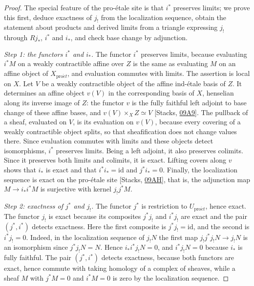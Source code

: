 \documentclass[11pt]{article}
\begin{document}
\begin{proof}[{Proof}]\label{bp180}%
The special feature of the pro-étale site is that \(i^*\) preserves limits; we prove this first, deduce exactness of \(j_!\) from the localization sequence, obtain the statement about products and derived limits from a triangle expressing \(j_!\) through \(Rj_*\), \(i^*\) and \(i_*\), and check base change by adjunction.

\emph{Step 1: the functors \(i^*\) and \(i_*\).} The functor \(i^*\) preserves limits, because evaluating \(i^*M\) on a weakly contractible affine over \(Z\) is the same as evaluating \(M\) on an affine object of \(X_{\mathrm{pro}\acute{e}t}\), and evaluation commutes with limits. The assertion is local on \(X\). Let \(V\) be a weakly contractible object of the affine ind-étale basis of \(Z\). It determines an affine object \(v(V)\) in the corresponding basis of \(X\), henselian along its inverse image of \(Z\): the functor \(v\) is the fully faithful left adjoint to base change of these affine bases, and \(v(V)\times_XZ\simeq V\) [Stacks, \href{https://stacks.math.columbia.edu/tag/09A9}{09A9}]. The pullback of a sheaf, evaluated on \(V\), is its evaluation on \(v(V)\), because every covering of a weakly contractible object splits, so that sheafification does not change values there. Since evaluation commutes with limits and these objects detect isomorphisms, \(i^*\) preserves limits. Being a left adjoint, it also preserves colimits. Since it preserves both limits and colimits, it is exact. Lifting covers along \(v\) shows that \(i_*\) is exact and that \(i^*i_*=\mathrm{id}\) and \(j^*i_*=0\). Finally, the localization sequence is exact on the pro-étale site [Stacks, \href{https://stacks.math.columbia.edu/tag/09AH}{09AH}], that is, the adjunction map \(M\to i_*i^*M\) is surjective with kernel \(j_!j^*M\).

\emph{Step 2: exactness of \(j^*\) and \(j_!\).} The functor \(j^*\) is restriction to \(U_{\mathrm{pro}\acute{e}t}\), hence exact. The functor \(j_!\) is exact because its composites \(j^*j_!\) and \(i^*j_!\) are exact and the pair \((j^*,i^*)\) detects exactness. Here the first composite is \(j^*j_!=\mathrm{id}\), and the second is \(i^*j_!=0\). Indeed, in the localization sequence of \(j_!N\) the first map \(j_!j^*j_!N\to j_!N\) is an isomorphism since \(j^*j_!N=N\). Hence \(i_*i^*j_!N=0\), and \(i^*j_!N=0\) because \(i_*\) is fully faithful. The pair \((j^*,i^*)\) detects exactness, because both functors are exact, hence commute with taking homology of a complex of sheaves, while a sheaf \(M\) with \(j^*M=0\) and \(i^*M=0\) is zero by the localization sequence.


\end{proof}
\end{document}
